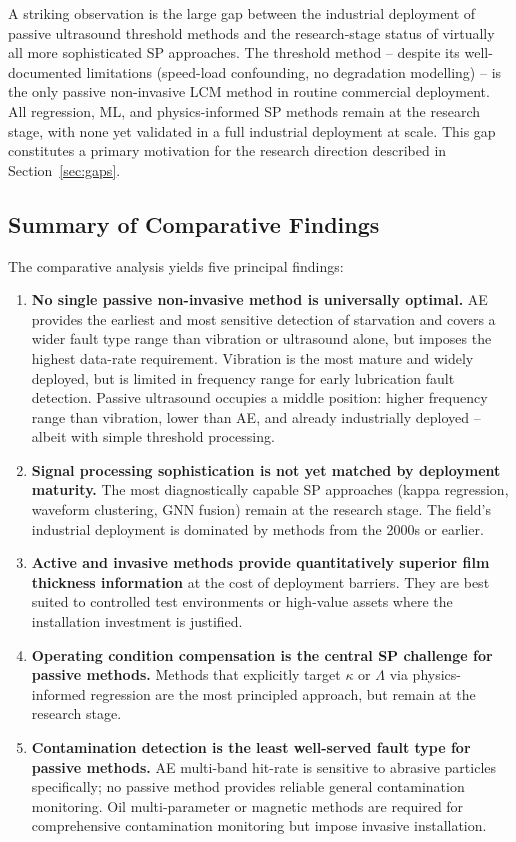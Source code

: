 A striking observation is the large gap between the industrial deployment of passive ultrasound threshold methods and the research-stage status of virtually all more sophisticated SP approaches. The threshold method -- despite its well-documented limitations (speed-load confounding, no degradation modelling) -- is the only passive non-invasive LCM method in routine commercial deployment. All regression, ML, and physics-informed SP methods remain at the research stage, with none yet validated in a full industrial deployment at scale. This gap constitutes a primary motivation for the research direction described in Section~\ref{sec:gaps}.

\subsection{Summary of Comparative Findings}
\label{subsec:comp_summary}

The comparative analysis yields five principal findings:

\begin{enumerate}
    \item \textbf{No single passive non-invasive method is universally optimal.} AE provides the earliest and most sensitive detection of starvation and covers a wider fault type range than vibration or ultrasound alone, but imposes the highest data-rate requirement. Vibration is the most mature and widely deployed, but is limited in frequency range for early lubrication fault detection. Passive ultrasound occupies a middle position: higher frequency range than vibration, lower than AE, and already industrially deployed -- albeit with simple threshold processing.
    \item \textbf{Signal processing sophistication is not yet matched by deployment maturity.} The most diagnostically capable SP approaches (kappa regression, waveform clustering, GNN fusion) remain at the research stage. The field's industrial deployment is dominated by methods from the 2000s or earlier.
    \item \textbf{Active and invasive methods provide quantitatively superior film thickness information} at the cost of deployment barriers. They are best suited to controlled test environments or high-value assets where the installation investment is justified.
    \item \textbf{Operating condition compensation is the central SP challenge for passive methods.} Methods that explicitly target $\kappa$ or $\Lambda$ via physics-informed regression are the most principled approach, but remain at the research stage.
    \item \textbf{Contamination detection is the least well-served fault type for passive methods.} AE multi-band hit-rate is sensitive to abrasive particles specifically; no passive method provides reliable general contamination monitoring. Oil multi-parameter or magnetic methods are required for comprehensive contamination monitoring but impose invasive installation.
\end{enumerate}
